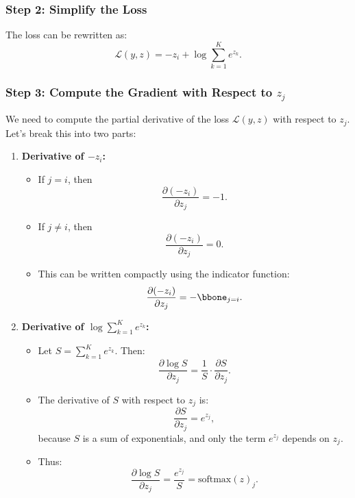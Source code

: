 \begin{notechapter}
\subsubsection{Step 2: Simplify the Loss}
The loss can be rewritten as:
\[
\mathcal{L}(y, z) = -z_i + \log \sum_{k=1}^K e^{z_k}.
\]

\subsubsection{Step 3: Compute the Gradient with Respect to \( z_j \)}
We need to compute the partial derivative of the loss \( \mathcal{L}(y, z) \) with respect to \( z_j \). Let's break this into two parts:

\begin{enumerate}
    \item \textbf{Derivative of \( -z_i \):}
    \begin{itemize}
        \item If \( j = i \), then 
              \[
              \frac{\partial (-z_i)}{\partial z_j} = -1.
              \]
        \item If \( j \neq i \), then 
              \[
              \frac{\partial (-z_i)}{\partial z_j} = 0.
              \]
        \item This can be written compactly using the indicator function:
              \[
              \frac{\partial (-z_i)}{\partial z_j} = -\bbone_{j = i}.
              \]
    \end{itemize}

    \item \textbf{Derivative of \( \log \sum_{k=1}^K e^{z_k} \):}
    \begin{itemize}
        \item Let \( S = \sum_{k=1}^K e^{z_k} \). Then:
              \[
              \frac{\partial \log S}{\partial z_j} = \frac{1}{S} \cdot \frac{\partial S}{\partial z_j}.
              \]
        \item The derivative of \( S \) with respect to \( z_j \) is:
              \[
              \frac{\partial S}{\partial z_j} = e^{z_j},
              \]
              because \( S \) is a sum of exponentials, and only the term \( e^{z_j} \) depends on \( z_j \).
        \item Thus:
              \[
              \frac{\partial \log S}{\partial z_j} = \frac{e^{z_j}}{S} = \text{softmax}(z)_j.
              \]
    \end{itemize}
\end{enumerate}


\end{notechapter}
